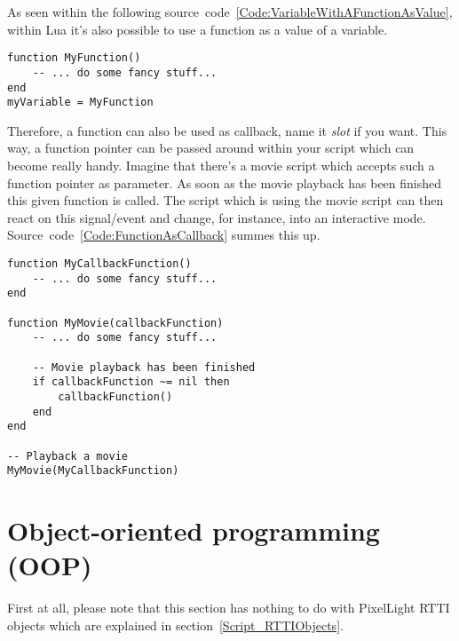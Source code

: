 As seen within the following source~code~\ref{Code:VariableWithAFunctionAsValue}, within Lua it's also possible to use a function as a value of a variable.
\begin{lstlisting}[float=htb,label=Code:VariableWithAFunctionAsValue,caption={Variable with a function as value}]
function MyFunction()
	-- ... do some fancy stuff...
end
myVariable = MyFunction
\end{lstlisting}
Therefore, a function can also be used as callback, name it \emph{slot} if you want. This way, a function pointer can be passed around within your script which can become really handy. Imagine that there's a movie script which accepts such a function pointer as parameter. As soon as the movie playback has been finished this given function is called. The script which is using the movie script can then react on this signal/event and change, for instance, into an interactive mode. Source~code~\ref{Code:FunctionAsCallback} summes this up.
\begin{lstlisting}[float=htb,label=Code:FunctionAsCallback,caption={Function as callback}]
function MyCallbackFunction()
	-- ... do some fancy stuff...
end

function MyMovie(callbackFunction)
	-- ... do some fancy stuff...

	-- Movie playback has been finished
	if callbackFunction ~= nil then
		callbackFunction()
	end
end

-- Playback a movie
MyMovie(MyCallbackFunction)
\end{lstlisting}




\section{Object-oriented programming (OOP)}
First at all, please note that this section has nothing to do with PixelLight RTTI objects which are explained in section~\ref{Script_RTTIObjects}.


